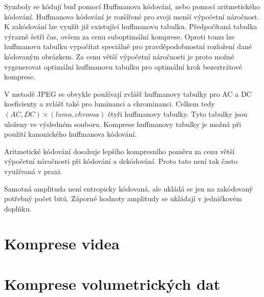 Symboly se kódují buď pomocí Huffmanova kódování, nebo pomocí aritmetického kódování.
Huffmanovo kódování je rozšířené pro svoji menší výpočetní náročnost.
K zakódování lze využít již existující huffmanovu tabulku.
Předpočítaná tabulka výrazně šetří čas, ovšem za cenu suboptimální komprese.
Oproti tomu lze huffmanovu tabulku vypočítat speciálně pro pravděpodobnostní rozložení dané kódovaným obrázkem.
Za cenu větší výpočetní náročnosti je proto možné vygenerovat optimální huffmanovu tabulku pro optimální krok bezeztrátové komprese.

V metodě JPEG se obvykle používají zvlášť huffmanovy tabulky pro AC a DC koeficienty a zvlášť také pro luminanci a chrominanci.
Celkem tedy $(AC, DC)\times(luma, chroma)$ čtyři huffmanovy tabulky.
Tyto tabulky jsou uloženy ve výsledném souboru.
Komprese huffmanovy tabulky je možná při použití kanonického huffmanova kódování.

Aritmetické kódování dosahuje lepšího kompresního poměru za cenu větší výpočetní náročnosti při kódování a dekódování.
Proto tato není tak často využívaná v praxi.

Samotná amplituda není entropicky kódovaná, ale ukládá se jen na zakódovaný potřebný počet bitů.
Záporné hodnoty amplitudy se ukládají v jedničkovém doplňku.

\section{Komprese videa}
\section{Komprese volumetrických dat}





